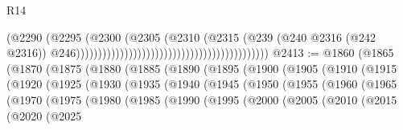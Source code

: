 \begin{lexlean}{R14}
\begin{coremodule}
                                                                              (@2290
                                                                                (@2295
                                                                                  (@2300
                                                                                    (@2305
                                                                                      (@2310
                                                                                        (@2315
                                                                                          (@239
                                                                                            (@240
                                                                                              @2316
                                                                                              (@242
                                                                                                @2316))
                                                                                            @246))))))))))))))))))))))))))))))))))))))))))))
@2413 := @1860
    (@1865
      (@1870
        (@1875
          (@1880
            (@1885
              (@1890
                (@1895
                  (@1900
                    (@1905
                      (@1910
                        (@1915
                          (@1920
                            (@1925
                              (@1930
                                (@1935
                                  (@1940
                                    (@1945
                                      (@1950
                                        (@1955
                                          (@1960
                                            (@1965
                                              (@1970
                                                (@1975
                                                  (@1980
                                                    (@1985
                                                      (@1990
                                                        (@1995
                                                          (@2000
                                                            (@2005
                                                              (@2010
                                                                (@2015
                                                                  (@2020
                                                                    (@2025

\end{coremodule}
\end{lexlean}
